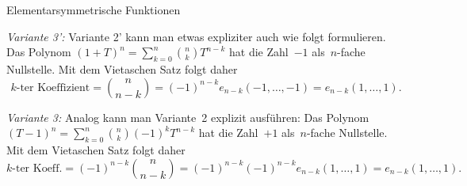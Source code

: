 \documentclass{algblatt}
\begin{document}
\begin{aufgabe}{Elementarsymmetrische Funktionen}
\begin{loesungE}
\emph{Variante 3':} Variante 2' kann man etwas expliziter auch wie folgt
formulieren. Das Polynom
$(1 + T)^n = \sum_{k=0}^n \binom{n}{k} T^{n-k}$
hat die Zahl~$-1$ als~$n$-fache Nullstelle. Mit dem Vietaschen Satz folgt daher
\[ \text{$k$-ter Koeffizient} = \binom{n}{n-k} =
  (-1)^{n-k} e_{n-k}(-1,\ldots,-1) = e_{n-k}(1,\ldots,1). \]

\emph{Variante 3:} Analog kann man Variante~2 explizit ausführen: Das Polynom
$(T - 1)^n = \sum_{k=0}^n \binom{n}{k} (-1)^k T^{n-k}$ hat die Zahl~$+1$
als~$n$-fache Nullstelle. Mit dem Vietaschen Satz folgt daher
\[ \text{$k$-ter Koeff.} = \textstyle (-1)^{n-k} \binom{n}{n-k} =
  (-1)^{n-k} (-1)^{n-k} e_{n-k}(1,\ldots,1) = e_{n-k}(1,\ldots,1). \]
\end{loesungE}
\end{aufgabe}
\end{document}
